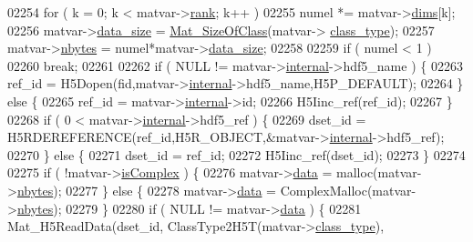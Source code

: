 \begin{DoxyCode}
{{{{{{{{{{02254             \textcolor{keywordflow}{for} ( k = 0; k < matvar->\hyperlink{group___m_a_t_a84ba70c96ded13cc555fa75b768d9921}{rank}; k++ )
02255                 numel *= matvar->\hyperlink{group___m_a_t_a8e01234e1c862ce3472bb37f5a09b92c}{dims}[k];
02256             matvar->\hyperlink{group___m_a_t_a9ad1c82e2b568da617e12dc73a26e1f9}{data\_size} = \hyperlink{group___m_a_t_ga2bf682f015b22fa796a8885e997661e7}{Mat\_SizeOfClass}(matvar->
      \hyperlink{group___m_a_t_aff13035bf3265dd7d9425e5d40c839d4}{class\_type});
02257             matvar->\hyperlink{group___m_a_t_abf1c844540503be2df9bb3db93cfe307}{nbytes}    = numel*matvar->\hyperlink{group___m_a_t_a9ad1c82e2b568da617e12dc73a26e1f9}{data\_size};
02258 
02259             \textcolor{keywordflow}{if} ( numel < 1 )
02260                 \textcolor{keywordflow}{break};
02261 
02262             \textcolor{keywordflow}{if} ( NULL != matvar->\hyperlink{group___m_a_t_a6e97e3ed9f40c49322c18561c2a94e92}{internal}->hdf5\_name ) \{
02263                 ref\_id = H5Dopen(fid,matvar->\hyperlink{group___m_a_t_a6e97e3ed9f40c49322c18561c2a94e92}{internal}->hdf5\_name,H5P\_DEFAULT);
02264             \} \textcolor{keywordflow}{else} \{
02265                 ref\_id = matvar->\hyperlink{group___m_a_t_a6e97e3ed9f40c49322c18561c2a94e92}{internal}->id;
02266                 H5Iinc\_ref(ref\_id);
02267             \}
02268             \textcolor{keywordflow}{if} ( 0 < matvar->\hyperlink{group___m_a_t_a6e97e3ed9f40c49322c18561c2a94e92}{internal}->hdf5\_ref ) \{
02269                 dset\_id = H5RDEREFERENCE(ref\_id,H5R\_OBJECT,&matvar->\hyperlink{group___m_a_t_a6e97e3ed9f40c49322c18561c2a94e92}{internal}->hdf5\_ref);
02270             \} \textcolor{keywordflow}{else} \{
02271                 dset\_id = ref\_id;
02272                 H5Iinc\_ref(dset\_id);
02273             \}
02274 
02275             \textcolor{keywordflow}{if} ( !matvar->\hyperlink{group___m_a_t_aeb03b3a69f108dc05470b00443a43739}{isComplex} ) \{
02276                 matvar->\hyperlink{group___m_a_t_a5672978efa230bbdecdf38ede781f7fa}{data} = malloc(matvar->\hyperlink{group___m_a_t_abf1c844540503be2df9bb3db93cfe307}{nbytes});
02277             \} \textcolor{keywordflow}{else} \{
02278                 matvar->\hyperlink{group___m_a_t_a5672978efa230bbdecdf38ede781f7fa}{data} = ComplexMalloc(matvar->\hyperlink{group___m_a_t_abf1c844540503be2df9bb3db93cfe307}{nbytes});
02279             \}
02280             \textcolor{keywordflow}{if} ( NULL != matvar->\hyperlink{group___m_a_t_a5672978efa230bbdecdf38ede781f7fa}{data} ) \{
02281                 Mat\_H5ReadData(dset\_id, ClassType2H5T(matvar->\hyperlink{group___m_a_t_aff13035bf3265dd7d9425e5d40c839d4}{class\_type}),
}}}}}}}}}}
\end{DoxyCode}
